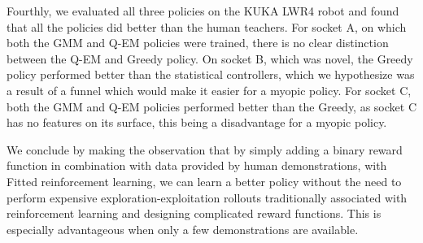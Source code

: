 \documentclass[final,3p,times,twocolumn]{elsarticle}
\begin{document}
Fourthly, we evaluated all three policies on the KUKA LWR4 robot and found that all the policies did better than the human 
teachers. For socket A, on which both the GMM and Q-EM policies were trained, there is no clear distinction between 
the Q-EM and Greedy policy. On socket B, which was novel, the Greedy policy performed better than the statistical controllers, 
which we hypothesize was a result of a funnel which would make it easier for a myopic policy. For socket C, both the 
GMM and Q-EM policies performed better than the Greedy, as socket C has no features on its surface, this being a disadvantage 
for a myopic policy.

We conclude by making the observation that by simply adding a binary reward function in combination with 
data provided by human demonstrations, with Fitted reinforcement learning, we can learn a better policy without 
the need to perform expensive exploration-exploitation rollouts traditionally associated with reinforcement learning and 
designing complicated reward functions. This is especially advantageous when only a few demonstrations are available.


\appendix


 

\end{document}

